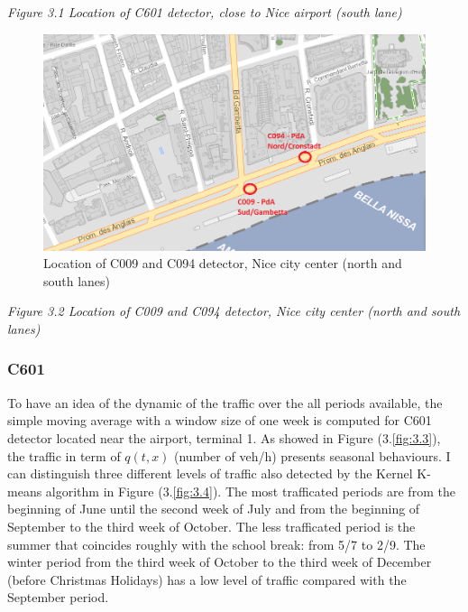 \documentclass[11pt]{article}
\begin{document}
\emph{\small Figure 3.1 Location of C601 detector, close to Nice airport (south lane)}

    \begin{figure}
    \centering
    \includegraphics[scale=0.5]{gambetta cronstadt.png}
    \caption{Location of C009 and C094 detector, Nice city center (north and south lanes)}
    \label{fig:3.2}
\end{figure}

\emph{\small Figure 3.2 Location of C009 and C094 detector, Nice city center (north and south lanes)}

    \hypertarget{c601}{%
\subsubsection{C601}\label{c601}}

    To have an idea of the dynamic of the traffic over the all periods
available, the simple moving average with a window size of one week is
computed for C601 detector located near the airport, terminal 1. As
showed in Figure (3.\ref{fig:3.3}), the traffic in term of \(q(t,x)\)
(number of veh/h) presents seasonal behaviours. I can distinguish three
different levels of traffic also detected by the Kernel K-means
algorithm in Figure (3.\ref{fig:3.4}). The most trafficated periods are
from the beginning of June until the second week of July and from the
beginning of September to the third week of October. The less
trafficated period is the summer that coincides roughly with the school
break: from 5/7 to 2/9. The winter period from the third week of October
to the third week of December (before Christmas Holidays) has a low
level of traffic compared with the September period.
\end{document}
